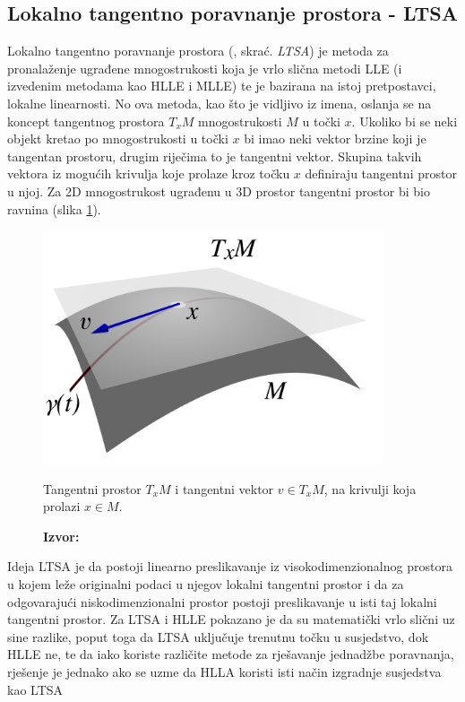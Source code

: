 \documentclass[times, utf8, diplomski]{fer}
\newcommand*{\captionsource}[2]{            %
    \RawFloats
    \caption{#1}
    \caption*{\textbf{Izvor:} #2}
}
\begin{document}
\subsection{Lokalno tangentno poravnanje prostora - LTSA}

Lokalno tangentno poravnanje prostora (, skrać. \emph{LTSA}) je metoda za pronalaženje ugrađene mnogostrukosti koja je vrlo slična metodi LLE (i izvedenim metodama kao HLLE i MLLE) te je bazirana na istoj pretpostavci, lokalne linearnosti. No ova metoda, kao što je vidljivo iz imena, oslanja se na koncept tangentnog prostora $T_xM$ mnogostrukosti $M$ u točki $x$. Ukoliko bi se neki objekt kretao po mnogostrukosti u točki $x$ bi imao neki vektor brzine koji je tangentan prostoru, drugim riječima to je tangentni vektor. Skupina takvih vektora iz mogućih krivulja koje prolaze kroz točku $x$ definiraju tangentni prostor u njoj. Za 2D mnogostrukost ugrađenu u 3D prostor tangentni prostor bi bio ravnina (slika \ref{fig:tanget_space}).

\bigskip
\begin{figure}[htb]
    \centering
    \includegraphics[width=10cm]{resources/images/reduction/tanget_space.png}
    \captionsource{Tangentni prostor $T_{x}M$ i tangentni vektor $v \in T_{x}M$, na krivulji koja prolazi $ x \in M$.}{\cite{wikimedia2008tangent}}
    \label{fig:tanget_space}
\end{figure}
\bigskip

Ideja LTSA je da postoji linearno preslikavanje iz visokodimenzionalnog prostora u kojem leže originalni podaci u njegov lokalni tangentni prostor i da za odgovarajući niskodimenzionalni prostor postoji preslikavanje u isti taj lokalni tangentni prostor. Za LTSA i HLLE pokazano je da su matematički vrlo slični uz sine razlike, poput toga da LTSA uključuje trenutnu točku u susjedstvo, dok HLLE ne, te da iako koriste različite metode za rješavanje jednadžbe poravnanja, rješenje je jednako ako se uzme da HLLA koristi isti način izgradnje susjedstva kao LTSA \citep{7837655}
\end{document}
